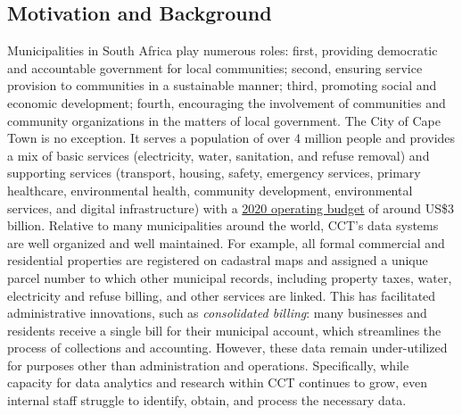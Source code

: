 \documentclass[
]{book}
\begin{document}
\hypertarget{motivation-and-background-6}{%
\subsection{Motivation and Background}\label{motivation-and-background-6}}

Municipalities in South Africa play numerous roles: first, providing democratic and accountable government for local communities; second, ensuring service provision to communities in a sustainable manner; third, promoting social and economic development; fourth, encouraging the involvement of communities and community organizations in the matters of local government. The City of Cape Town is no exception. It serves a population of over 4 million people and provides a mix of basic services (electricity, water, sanitation, and refuse removal) and supporting services (transport, housing, safety, emergency services, primary healthcare, environmental health, community development, environmental services, and digital infrastructure) with a \href{http://resource.capetown.gov.za/documentcentre/Documents/Financial\%20documents/1920AdjBudget_Ann1_1_OpexAdjSummary_May2020.pdf}{2020 operating budget} of around US\$3 billion. Relative to many municipalities around the world, CCT's data systems are well organized and well maintained. For example, all formal commercial and residential properties are registered on cadastral maps and assigned a unique parcel number to which other municipal records, including property taxes, water, electricity and refuse billing, and other services are linked. This has facilitated administrative innovations, such as \emph{consolidated billing}: many businesses and residents receive a single bill for their municipal account, which streamlines the process of collections and accounting. However, these data remain under-utilized for purposes other than administration and operations. Specifically, while capacity for data analytics and research within CCT continues to grow, even internal staff struggle to identify, obtain, and process the necessary data.
\end{document}
